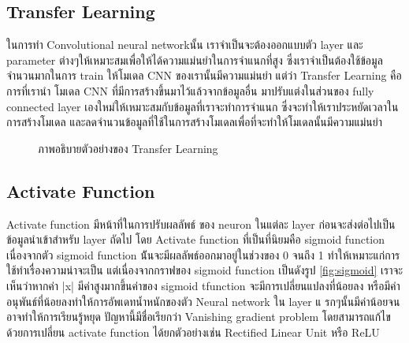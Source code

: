 \documentclass[12pt,oneside,openright,a4paper]{cpe-thai-project}
\begin{document}
\subsection{Transfer Learning}
ในการทำ Convolutional neural networkนั้น เราจำเป็นจะต้องออกแบบตัว layer และ parameter ต่างๆให้เหมาะสมเพื่อให้ได้ความแม่นยำในการจำแนกที่สูง
ซึ่งเราจำเป็นต้องใช้ข้อมูลจำนวนมากในการ train ให้โมเดล CNN ของเรานั้นมีความแม่นยำ แต่ว่า Transfer Learning คือการที่เรานำ โมเดล CNN ที่มีการสร้างขึ้นมาไว้แล้วจากข้อมูลอื่น มาปรับแต่งในส่วนของ
fully connected layer เองใหม่ให้เหมาะสมกับข้อมูลที่เราจะทำการจำแนก ซึ่งจะทำให้เราประหยัดเวลาในการสร้างโมเดล และลดจำนวนข้อมูลที่ใช้ในการสร้างโมเดลเพื่อที่จะทำให้โมเดลนั้นมีความแม่นยำ
\begin{figure}[!ht]\centering
  \setlength{\fboxrule}{0.2mm} %
  \setlength{\fboxsep}{1cm}
  \caption{ภาพอธิบายตัวอย่างของ Transfer Learning}\label{fig:transfer}
\end{figure}

\newpage 
\subsection{Activate Function}
Activate function มีหน้าที่ในการปรับผลลัพธ์ ของ neuron ในแต่ละ layer ก่อนจะส่งต่อไปเป็นข้อมูลนำเข้าสำหรับ layer ถัดไป โดย Activate function ที่เป็นที่นิยมคือ sigmoid function เนื่องจากตัว sigmoid function 
น้ันจะมีผลลัพธ์ออกมาอยู่ในช่วงของ 0 จนถึง 1 ทำให้เหมาะแก่การใช้ทำเรื่องความน่าจะเป็น แต่เนื่องจากกราฟของ sigmoid function เป็นดังรูป \ref{fig:sigmoid}  เราจะเห็นว่าหากค่า |x| มีค่าสูงมากขึ้นค่าของ sigmoid tfunction จะมีการเปลี่ยนแปลงที่น้อยลง 
หรือมีค่าอนุพันธ์ที่น้อยลงทำให้การอัพเดทน้ำหนักของตัว Neural network ใน layer แ รกๆนั้นมีค่าน้อยจนอาจทำให้การเรียนรู้หยุด  
ปัญหานี้มีชื่อเรียกว่า Vanishing gradient problem โดยสามารถแก้ไขด้วยการเปลี่ยน activate function ได้ยกตัวอย่างเช่น Rectified Linear Unit หรือ ReLU
\end{document}
